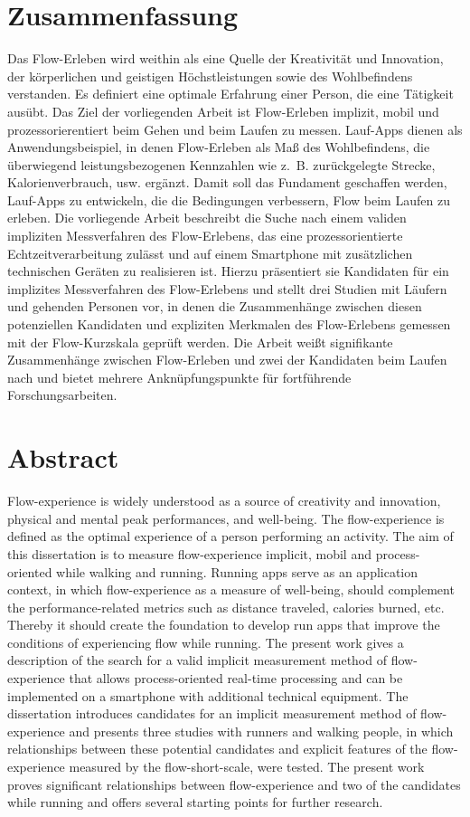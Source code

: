 

\section*{Zusammenfassung} Das Flow-Erleben wird weithin als eine Quelle der Kreativität und Innovation, der körperlichen und geistigen Höchstleistungen sowie des Wohlbefindens verstanden. Es definiert eine optimale Erfahrung einer Person, die eine Tätigkeit ausübt. Das Ziel der vorliegenden Arbeit ist Flow-Erleben implizit, mobil und prozessorierentiert beim Gehen und beim Laufen zu messen. Lauf-Apps dienen als Anwendungsbeispiel, in denen Flow-Erleben als Maß des Wohlbefindens, die überwiegend leistungsbezogenen Kennzahlen wie z.~B. zurückgelegte Strecke, Kalorienverbrauch, usw. ergänzt. Damit soll das Fundament geschaffen werden, Lauf-Apps zu entwickeln, die die Bedingungen verbessern, Flow beim Laufen zu erleben. Die vorliegende Arbeit beschreibt die Suche nach einem validen impliziten Messverfahren des Flow-Erlebens, das eine prozessorientierte Echtzeitverarbeitung zulässt und auf einem Smartphone mit zusätzlichen technischen Geräten zu realisieren ist. Hierzu präsentiert sie Kandidaten für ein implizites Messverfahren des Flow-Erlebens und stellt drei Studien mit Läufern und gehenden Personen vor, in denen die Zusammenhänge zwischen diesen potenziellen Kandidaten und expliziten Merkmalen des Flow-Erlebens gemessen mit der Flow-Kurzskala geprüft werden. Die Arbeit weißt signifikante Zusammenhänge zwischen Flow-Erleben und zwei der Kandidaten beim Laufen nach und bietet mehrere Anknüpfungspunkte für fortführende Forschungsarbeiten. 
\newpage

\section*{Abstract} Flow-experience is widely understood as a source of creativity and innovation, physical and mental peak performances, and well-being. The flow-experience is defined as the optimal experience of a person performing an activity. The aim of this dissertation is to measure flow-experience implicit, mobil and process-oriented while walking and running. Running apps serve as an application context, in which flow-experience as a measure of well-being, should complement the performance-related metrics such as distance traveled, calories burned, etc. Thereby it should create the foundation to develop run apps that improve the conditions of experiencing flow while running. The present work gives a description of the search for a valid implicit measurement method of flow-experience that allows process-oriented real-time processing and can be implemented on a smartphone with additional technical equipment. The dissertation introduces candidates for an implicit measurement method of flow-experience and presents three studies with runners and walking people, in which relationships between these potential candidates and explicit features of the flow-experience measured by the flow-short-scale, were tested. The present work proves significant relationships between flow-experience and two of the candidates while running and offers several starting points for further research. 
